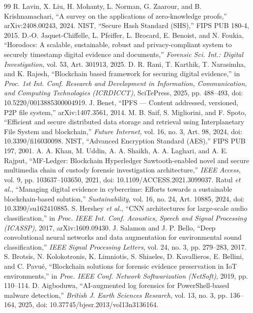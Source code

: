 \documentclass[conference,a4paper,10pt]{IEEEtran}
\begin{document}
\begin{thebibliography}{99}
 R. Lavin, X. Liu, H. Mohanty, L. Norman, G. Zaarour, and B. Krishnamachari, ``A survey on the applications of zero-knowledge proofs,'' arXiv:2408.00243, 2024.
 NIST, ``Secure Hash Standard (SHS),'' FIPS PUB 180-4, 2015.
 D.-O. Jaquet-Chiffelle, L. Pfeiffer, L. Brocard, E. Benoist, and N. Foukia, ``Horodocs: A scalable, sustainable, robust and privacy-compliant system to securely timestamp digital evidence and documents,'' \emph{Forensic Sci. Int.: Digital Investigation}, vol. 53, Art. 301913, 2025.
 D. R. Rani, T. Karthik, T. Narasimha, and K. Rajesh, ``Blockchain based framework for securing digital evidence,'' in \emph{Proc. 1st Int. Conf. Research and Development in Information, Communication, and Computing Technologies (ICRDICCT)}, SciTePress, 2025, pp. 488--493, doi: 10.5220/0013885300004919.
 J. Benet, ``IPFS --- Content addressed, versioned, P2P file system,'' arXiv:1407.3561, 2014.
 M. B. Saif, S. Migliorini, and F. Spoto, ``Efficient and secure distributed data storage and retrieval using Interplanetary File System and blockchain,'' \emph{Future Internet}, vol. 16, no. 3, Art. 98, 2024, doi: 10.3390/fi16030098.
 NIST, ``Advanced Encryption Standard (AES),'' FIPS PUB 197, 2001.
 A. A. Khan, M. Uddin, A. A. Shaikh, A. A. Laghari, and A. E. Rajput, ``MF-Ledger: Blockchain Hyperledger Sawtooth-enabled novel and secure multimedia chain of custody forensic investigation architecture,'' \emph{IEEE Access}, vol. 9, pp. 103637--103650, 2021, doi: 10.1109/ACCESS.2021.3099037.
 Ratul \emph{et al.}, ``Managing digital evidence in cybercrime: Efforts towards a sustainable blockchain-based solution,'' \emph{Sustainability}, vol. 16, no. 24, Art. 10885, 2024, doi: 10.3390/su162410885.
 S. Hershey \emph{et al.}, ``CNN architectures for large-scale audio classification,'' in \emph{Proc. IEEE Int. Conf. Acoustics, Speech and Signal Processing (ICASSP)}, 2017, arXiv:1609.09430.
 J. Salamon and J. P. Bello, ``Deep convolutional neural networks and data augmentation for environmental sound classification,'' \emph{IEEE Signal Processing Letters}, vol. 24, no. 3, pp. 279--283, 2017.
 S. Brotsis, N. Kolokotronis, K. Limniotis, S. Shiaeles, D. Kavallieros, E. Bellini, and C. Pavu\'e, ``Blockchain solutions for forensic evidence preservation in IoT environments,'' in \emph{Proc. IEEE Conf. Network Softwarization (NetSoft)}, 2019, pp. 110--114.
 D. Aigboduwa, ``AI-augmented log forensics for PowerShell-based malware detection,'' \emph{British J. Earth Sciences Research}, vol. 13, no. 3, pp. 136--164, 2025, doi: 10.37745/bjesr.2013/vol13n3136164. %

\end{thebibliography}
\end{document}
